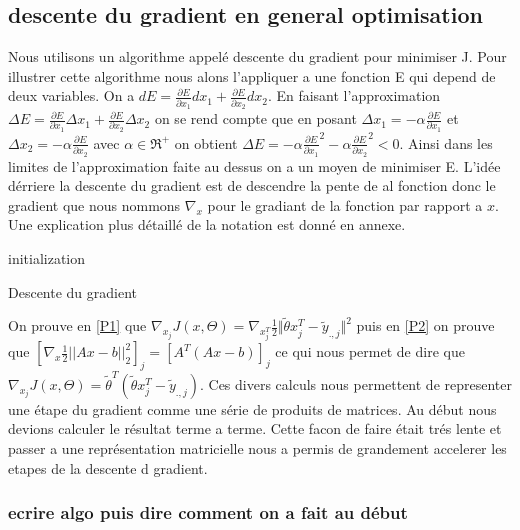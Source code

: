 \documentclass[a4paper,10pt]{article}
\begin{document}
\subsection{descente du gradient en general optimisation}
Nous utilisons un algorithme appelé descente du gradient pour minimiser J. Pour illustrer cette algorithme nous alons l'appliquer 
a une fonction E qui depend de deux variables.%
 On a $dE = \frac{\partial E}{\partial x_{1}}d x_{1} + \frac{\partial E}{\partial x_{2}}dx_{2}$. En faisant l'approximation
 $\Delta E = \frac{\partial E}{\partial x_{1}}\Delta  x_{1} + \frac{\partial E}{\partial x_{2}}\Delta x_{2}$ on se rend compte
 que en posant $\Delta x_{1} = -\alpha \frac{\partial E}{\partial x_{1}}$
 et $\Delta x_{2} = -\alpha \frac{\partial E}{\partial x_{2}}$ avec $\alpha \in \Re^{+}$
 on obtient $\Delta E = -\alpha \frac{\partial E}{\partial x_{1}}^{2} - \alpha \frac{\partial E}{\partial x_{2}}^{2} < 0$. Ainsi dans
 les limites de l'approximation faite au dessus on a un moyen de minimiser E.
L'idée dérriere la descente du gradient 
est de descendre la pente de al fonction donc le gradient que nous nommons $\nabla_{x}$ pour le gradiant de la fonction par rapport 
a $x$. Une explication plus détaillé de la notation est donné en annexe.  
 
\begin{algorithm}[H]
 initialization\;
 \caption{Descente du gradient}
\end{algorithm}
On prouve en \ref{P1} que $ \nabla_{x_{j}}J(x, \Theta) = \nabla_{x_{j}^T}\frac{1}{2}\Vert\tilde{\theta}x_{j}^{T}-\tilde{y}_{.,j}\Vert^{2}$
puis en \ref{P2} on prouve que $[\nabla_{x} \frac{1}{2}||Ax - b||^{2}_{2}]_{j} = [A^{T}(Ax - b)]_{j}$ ce qui nous permet de dire
que $ \nabla_{x_{j}}J(x, \Theta) =  \tilde{\theta}^{T}(\tilde{\theta}x_{j}^{T}-\tilde{y}_{.,j})$. Ces divers calculs nous permettent
de representer une étape du gradient comme une série de produits de matrices. Au début nous devions calculer le résultat terme a terme. Cette
facon de faire était trés lente et passer a une représentation matricielle nous a permis de grandement accelerer les etapes de la descente d gradient.
\subsubsection{ecrire algo puis dire comment on a fait au début}
\end{document}
